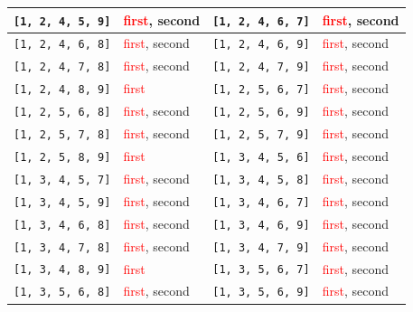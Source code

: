 \begin{longtable}{|p{3.5cm}|p{2.5cm}||p{3.5cm}|p{2.5cm}|}
\texttt{[1, 2, 4, 5, 9]} & \textcolor{red}{first}, \textcolor{CustomBlue}{second} & \texttt{[1, 2, 4, 6, 7]} & \textcolor{red}{first}, \textcolor{CustomBlue}{second} \\ \hline
\texttt{[1, 2, 4, 6, 8]} & \textcolor{red}{first}, \textcolor{CustomBlue}{second} & \texttt{[1, 2, 4, 6, 9]} & \textcolor{red}{first}, \textcolor{CustomBlue}{second} \\ \hline
\texttt{[1, 2, 4, 7, 8]} & \textcolor{red}{first}, \textcolor{CustomBlue}{second} & \texttt{[1, 2, 4, 7, 9]} & \textcolor{red}{first}, \textcolor{CustomBlue}{second} \\ \hline
\texttt{[1, 2, 4, 8, 9]} & \textcolor{red}{first} & \texttt{[1, 2, 5, 6, 7]} & \textcolor{red}{first}, \textcolor{CustomBlue}{second} \\ \hline
\texttt{[1, 2, 5, 6, 8]} & \textcolor{red}{first}, \textcolor{CustomBlue}{second} & \texttt{[1, 2, 5, 6, 9]} & \textcolor{red}{first}, \textcolor{CustomBlue}{second} \\ \hline
\texttt{[1, 2, 5, 7, 8]} & \textcolor{red}{first}, \textcolor{CustomBlue}{second} & \texttt{[1, 2, 5, 7, 9]} & \textcolor{red}{first}, \textcolor{CustomBlue}{second} \\ \hline
\texttt{[1, 2, 5, 8, 9]} & \textcolor{red}{first} & \texttt{[1, 3, 4, 5, 6]} & \textcolor{red}{first}, \textcolor{CustomBlue}{second} \\ \hline
\texttt{[1, 3, 4, 5, 7]} & \textcolor{red}{first}, \textcolor{CustomBlue}{second} & \texttt{[1, 3, 4, 5, 8]} & \textcolor{red}{first}, \textcolor{CustomBlue}{second} \\ \hline
\texttt{[1, 3, 4, 5, 9]} & \textcolor{red}{first}, \textcolor{CustomBlue}{second} & \texttt{[1, 3, 4, 6, 7]} & \textcolor{red}{first}, \textcolor{CustomBlue}{second} \\ \hline
\texttt{[1, 3, 4, 6, 8]} & \textcolor{red}{first}, \textcolor{CustomBlue}{second} & \texttt{[1, 3, 4, 6, 9]} & \textcolor{red}{first}, \textcolor{CustomBlue}{second} \\ \hline
\texttt{[1, 3, 4, 7, 8]} & \textcolor{red}{first}, \textcolor{CustomBlue}{second} & \texttt{[1, 3, 4, 7, 9]} & \textcolor{red}{first}, \textcolor{CustomBlue}{second} \\ \hline
\texttt{[1, 3, 4, 8, 9]} & \textcolor{red}{first} & \texttt{[1, 3, 5, 6, 7]} & \textcolor{red}{first}, \textcolor{CustomBlue}{second} \\ \hline
\texttt{[1, 3, 5, 6, 8]} & \textcolor{red}{first}, \textcolor{CustomBlue}{second} & \texttt{[1, 3, 5, 6, 9]} & \textcolor{red}{first}, \textcolor{CustomBlue}{second} \\ \hline

\end{longtable}
